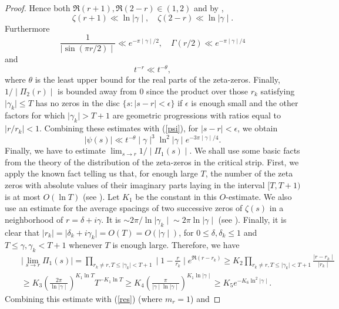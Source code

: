 \documentclass{article}
\begin{document}
\begin{proof}
Hence both $\Re{(r+1)}, \Re{(2-r)}\in (1,2)$
and by \cite[Thm.\ 1.9, p.\ 25]{ivic2003},
$$
\zeta(r+1)\ll\ln{\mid\gamma\mid}, \quad
\zeta(2-r)\ll\ln{\mid\gamma\mid}.
$$
Furthermore
$$
\frac{1}{\mid\sin{(\pi r/2)}\mid}\ll e^{-\pi\mid\gamma\mid/2}, \quad
\Gamma(r/2)\ll e^{-\pi\mid\gamma\mid/4}
$$
and
$$
t^{-r}\ll t^{-\theta},
$$
where $\theta$ is the least upper bound for the real parts of the
zeta-zeros. Finally, $1/\mid\Pi_2(r)\mid$ is bounded away from $0$
since the product over those $r_k$ satisfying $\mid\gamma_k\mid\le
T$ has no zeros in the disc $\{s:\mid s-r\mid<\epsilon\}$ if
$\epsilon$ is enough small and the other factors for which
$\mid\gamma_k\mid>T+1$ are geometric progressions with ratios
equal to $\mid r/r_k\mid<1$. Combining these estimates with
(\ref{psi}), for $\mid s-r\mid<\epsilon$, we obtain
\begin{equation}\label{psiestimate}
\mid\psi(s)\mid\ll
t^{-\theta}\mid\gamma\mid^3\ln^2{\mid\gamma\mid}
e^{-3\pi\mid\gamma\mid/4}.
\end{equation}
Finally, we have to estimate $\lim_{s\to r} 1/\mid\Pi_1(s)\mid$.
We shall use some basic facts from the theory of the distribution
of the zeta-zeros in the critical strip. First, we apply the known
fact telling us that, for enough large $T$, the number of the zeta
zeros with absolute values of their imaginary parts laying in the
interval $[T,T+1)$ is at most $O(\ln{T})$ (see \cite[p.\ 211]{Titchmarsh86}). 
Let $K_1$ be the constant in this $O$-estimate. We also use
an estimate for the average spacings of two successive zeros of
$\zeta(s)$ in a neighborhood of $r=\delta+i\gamma$. It is $\sim
2\pi/\ln{\mid\gamma_k\mid}\sim 2\pi\ln{\mid\gamma\mid}$ (see
\cite[pp.\ 214, 246]{Titchmarsh86}). Finally, it is clear that $\mid
r_k\mid=\mid\delta_k+i\gamma_k\mid=O(T)=O(\mid\gamma\mid)$, for
$0\le\delta,\delta_k\le 1$ and $T\le \gamma,\gamma_k<T+1$ whenever
$T$ is enough large. Therefore, we have
\begin{eqnarray}
& & \mid\lim_{s\to r}\Pi_1(s)\mid
 =\prod_{r_k\neq r,T\le\mid\gamma_k\mid<T+1} \mid 1-\frac{r}{r_k}\mid
e^{\Re{(r-r_k)}} \ge K_2\prod_{r_k\neq r,
T\le\mid\gamma_k\mid<T+1} \frac{\mid
r-r_k\mid}{\mid r_k\mid} \nonumber \\
& & \ge
K_3\left(\frac{2\pi}{\ln{\mid\gamma\mid}}\right)^{K_1\ln{T}}
T^{-K_1\ln{T}} \ge
K_4\left(\frac{\pi}{\mid\gamma\mid\ln{\mid\gamma\mid}}\right)^{K_1\ln{\mid\gamma\mid}}
\ge K_5 e^{-K_6\ln^2{\mid\gamma\mid}}. \nonumber
\end{eqnarray}
Combining this estimate with (\ref{res}) (where $m_r=1$) and

\end{proof}
\end{document}
